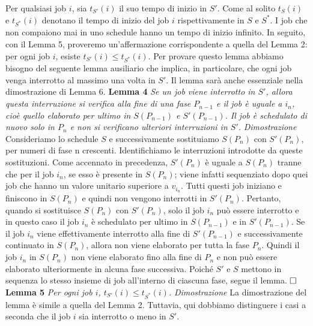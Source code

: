 \documentclass[12pt]{article}
\begin{document}
Per qualsiasi job $i$, sia $t_{S'}(i)$ il suo tempo di inizio in $S'$. Come al solito $t_{S}(i)$ e $t_{S^{*}}(i)$ denotano il tempo di inizio del job $i$ rispettivamente in $S$ e $S^{*}$. I job che non compaiono mai in uno schedule hanno un tempo di inizio infinito. In seguito, con il Lemma 5, proveremo un'affermazione corrispondente a quella del Lemma 2: per ogni job $i$, esiste $t_{S'}(i) \leq  t_{S^{*}}(i)$. Per provare questo lemma abbiamo bisogno del seguente lemma ausiliario che implica, in particolare, che ogni job venga interrotto al massimo una volta in $S'$. Il lemma sarà anche essenziale nella dimostrazione di Lemma 6.
\newline\newline
\textbf{Lemma 4}
\textit{Se un job viene interrotto in $S'$, allora questa interruzione si verifica alla fine di una fase $P_{n-1}$ e il job è uguale a $i_{n}$, cioè quello elaborato per ultimo in $S(P_{n-1})$ e $S'(P_{n-1})$. Il job è schedulato di nuovo solo in $P_{n}$ e non si verificano ulteriori interruzioni in $S'$.}
\newline\newline
\textit{Dimostrazione}
Consideriamo lo schedule $S$ e successivamente sostituiamo $S(P_{n})$ con $S'(P_{n})$, per numeri di fase n crescenti. Identifichiamo le interruzioni introdotte da queste sostituzioni. Come accennato in precedenza, $S'(P_{n})$ è uguale a $S(P_{n})$ tranne che per il job $i_{n}$, se esso è presente in $S(P_{n})$; viene infatti sequenziato dopo quei job che hanno un valore unitario superiore a $v_{i_{n}}$. Tutti questi job iniziano e finiscono in $S(P_{n})$ e quindi non vengono interrotti in $S'(P_{n})$. Pertanto, quando si sostituisce $S(P_{n})$ con $S'(P_{n})$, solo il job $i_{n}$ può essere interrotto e in questo caso il job $i_{n}$ è schedulato per ultimo in $S(P_{n-1})$ e in $S'(P_{n-1})$. Se il job $i_{n}$ viene effettivamente interrotto alla fine di $S'(P_{n-1})$ e successivamente continuato in $S(P_{n})$, allora non viene elaborato per tutta la fase $P_{n}$. Quindi il job $i_{n}$ in $S(P_{n})$ non viene elaborato fino alla fine di $P_{n}$ e non può essere elaborato ulteriormente in alcuna fase successiva. Poiché $S'$ e $S$ mettono in sequenza lo stesso insieme di job all'interno di ciascuna fase, segue il lemma. $\hfill \square$
\newline \newline
\textbf{Lemma 5}
\textit{Per ogni job $i$, $t_{S'}(i) \leq t_{S^{*}}(i)$.}
\newline \newline
\textit{Dimostrazione}
La dimostrazione del lemma è simile a quella del Lemma 2. Tuttavia, qui dobbiamo distinguere i casi a seconda che il job $i$ sia interrotto o meno in $S'$. 
\end{document}
